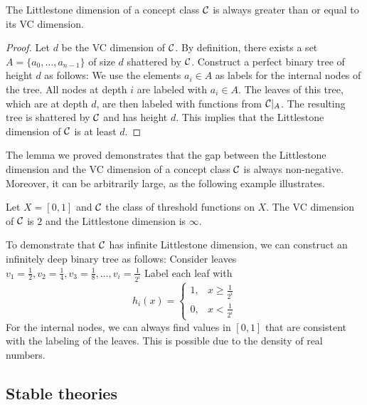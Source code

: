 \begin{lemma}
    \label{lemma:LdimboundsVC}
    The Littlestone dimension of a concept class $\mathcal{C}$ is always greater than or equal to its VC dimension.
\end{lemma}
\begin{proof}
    Let $d$ be the VC dimension of $\mathcal{C}$. By definition, there exists a set $A=\{a_0,\ldots,a_{n-1}\}$ of size $d$ shattered by $\mathcal{C}$. Construct a perfect binary tree of height $d$ as follows: We use the elements $a_i \in A$ as labels for the internal nodes of the tree. All nodes at depth $i$ are labeled with $a_i\in A$. The leaves of this tree, which are at depth $d$, are then labeled with functions from $\mathcal{C}|_A$. 
    The resulting tree is shattered by $\mathcal{C}$ and has height $d$. This implies that the Littlestone dimension of $\mathcal{C}$ is at least $d$.
\end{proof}

The lemma we proved demonstrates that the gap between the Littlestone dimension and the VC dimension of a concept class $\mathcal{C}$ is always non-negative. Moreover, it can be arbitrarily large, as the following example illustrates.

\begin{example}
\begin{outline}
    \0 Let $X=[0,1]$ and $\mathcal{C}$ the class of threshold functions on $X$. The VC dimension of $\mathcal{C}$ is $2$ and the Littlestone dimension is $\infty$. 
    
    \0 To demonstrate that $\mathcal{C}$ has infinite Littlestone dimension, we can construct an infinitely deep binary tree as follows:
        \1 Consider leaves $v_1 = \frac{1}{2}, v_2=\frac{1}{4}, v_3=\frac{1}{8},\ldots,v_i=\frac{1}{2^i}$ 
        \1 Label each leaf with 
        $$
        h_i(x)=
        \begin{cases}
            1,& x \geq \frac{1}{2^i} \\
            0,& x < \frac{1}{2^i}
        \end{cases}
        $$
    \0 For the internal nodes, we can always find values in $[0,1]$ that are consistent with the labeling of the leaves. This is possible due to the density of real numbers.
\end{outline}
\end{example}

\subsection{Stable theories}

